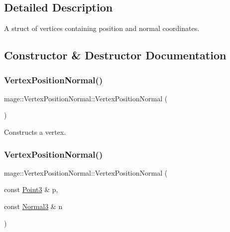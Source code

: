 \subsection{Detailed Description}
A struct of vertices containing position and normal coordinates. 

\subsection{Constructor \& Destructor Documentation}
\hypertarget{structmage_1_1_vertex_position_normal_a470e35daf194befbf45ac3ecfd6848e3}{}\label{structmage_1_1_vertex_position_normal_a470e35daf194befbf45ac3ecfd6848e3} 
\subsubsection{\texorpdfstring{Vertex\+Position\+Normal()}{VertexPositionNormal()}\hspace{0.1cm}{\footnotesize\ttfamily [1/4]}}
{\footnotesize\ttfamily mage\+::\+Vertex\+Position\+Normal\+::\+Vertex\+Position\+Normal (\begin{DoxyParamCaption}{ }\end{DoxyParamCaption})\hspace{0.3cm}{\ttfamily [default]}}

Constructs a vertex. \hypertarget{structmage_1_1_vertex_position_normal_ad2fc50a2050b9a7c961e1bd98d736710}{}\label{structmage_1_1_vertex_position_normal_ad2fc50a2050b9a7c961e1bd98d736710} 
\subsubsection{\texorpdfstring{Vertex\+Position\+Normal()}{VertexPositionNormal()}\hspace{0.1cm}{\footnotesize\ttfamily [2/4]}}
{\footnotesize\ttfamily mage\+::\+Vertex\+Position\+Normal\+::\+Vertex\+Position\+Normal (\begin{DoxyParamCaption}\item[{const \hyperlink{structmage_1_1_point3}{Point3} \&}]{p,  }\item[{const \hyperlink{structmage_1_1_normal3}{Normal3} \&}]{n }\end{DoxyParamCaption})\hspace{0.3cm}{\ttfamily [explicit]}}

